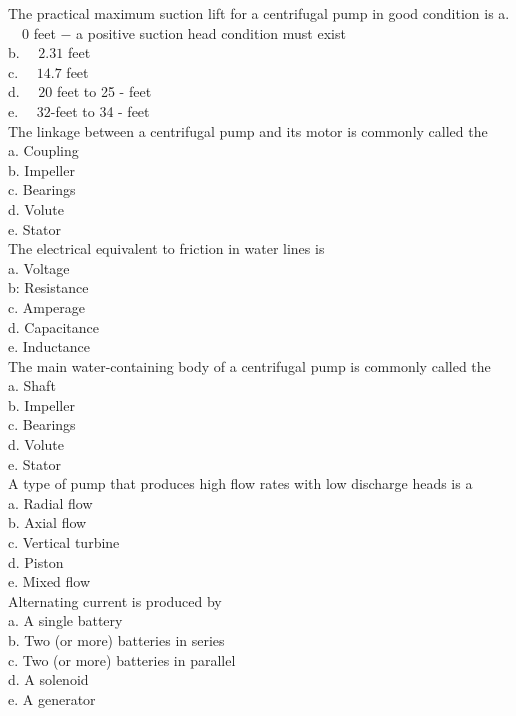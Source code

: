 The practical maximum suction lift for a centrifugal pump in good condition is a. $\quad 0$ feet $-$ a positive suction head condition must exist\\
b. $\quad 2.31$ feet\\
c. $\quad 14.7$ feet\\
d. $\quad 20$ feet to 25 - feet\\
e. $\quad 32$-feet to 34 - feet\\

The linkage between a centrifugal pump and its motor is commonly called the\\
a. Coupling\\
b. Impeller\\
c. Bearings\\
d. Volute\\
e. Stator\\

The electrical equivalent to friction in water lines is\\
a. Voltage\\
b: Resistance\\
c. Amperage\\
d. Capacitance\\
e. Inductance\\

The main water-containing body of a centrifugal pump is commonly called the\\
a. Shaft\\
b. Impeller\\
c. Bearings\\
d. Volute\\
e. Stator\\

A type of pump that produces high flow rates with low discharge heads is a\\
a. Radial flow\\
b. Axial flow\\
c. Vertical turbine\\
d. Piston\\
e. Mixed flow\\

Alternating current is produced by\\
a. A single battery\\
b. Two (or more) batteries in series\\
c. Two (or more) batteries in parallel\\
d. A solenoid\\
e. A generator \\

